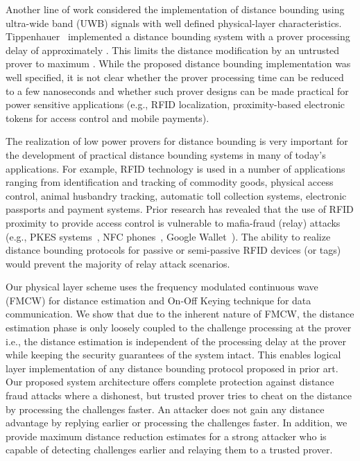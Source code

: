 \documentclass{sig-alternate-10pt}
\newcommand{\eg}{e.g.,\xspace}
\newcommand{\ie}{i.e.,\xspace}
\begin{document}
Another line of work considered the implementation of distance bounding using
ultra-wide band (UWB) signals with well defined physical-layer characteristics.
Tippenhauer~\cite{Tippenhauer12} implemented a distance bounding system with a
prover processing delay of approximately . This limits the
distance modification by an untrusted prover to maximum . While the
proposed distance bounding implementation was well specified, it is not clear
whether the prover processing time can be reduced to a few nanoseconds and
whether such prover designs can be made practical for power sensitive
applications (e.g., RFID localization, proximity-based electronic tokens for
access control and mobile payments).

The realization of low power provers for distance bou\-nding is very important
for the development of practical distance bounding systems in many of today's
applications. For example, RFID technology is used in a number of applications
ranging from identification and tracking of commodity goods, physical access
control, animal husbandry tracking, automatic toll collection systems,
electronic passports and payment systems. Prior research has revealed that the
use of RFID proximity to provide access control is vulnerable to mafia-fraud
(relay) attacks (\eg PKES systems~\cite{FrancillonFeb11}, NFC
phones~\cite{FrancisDec10}, Google Wallet~\cite{RolandSep12}). The ability to
realize distance bounding protocols for passive or semi-passive RFID devices (or
tags) would prevent the majority of relay attack scenarios.

Our physical layer scheme uses the frequency modulated continuous wave (FMCW)
for distance estimation and On-Off Keying technique for data communication. We
show that due to the inherent nature of FMCW, the distance estimation phase is
only loosely coupled to the challenge processing at the prover \ie the distance
estimation is independent of the processing delay at the prover while keeping
the security guarantees of the system intact. This enables logical layer
implementation of any distance bounding protocol proposed in prior art. Our
proposed system architecture offers complete protection against distance fraud
attacks where a dishonest, but trusted prover tries to cheat on the distance by
processing the challenges faster. An attacker does not gain any distance
advantage by replying earlier or processing the challenges faster. In addition,
we provide maximum distance reduction estimates for a strong attacker who is
capable of detecting challenges earlier and relaying them to a trusted prover.
\end{document}
